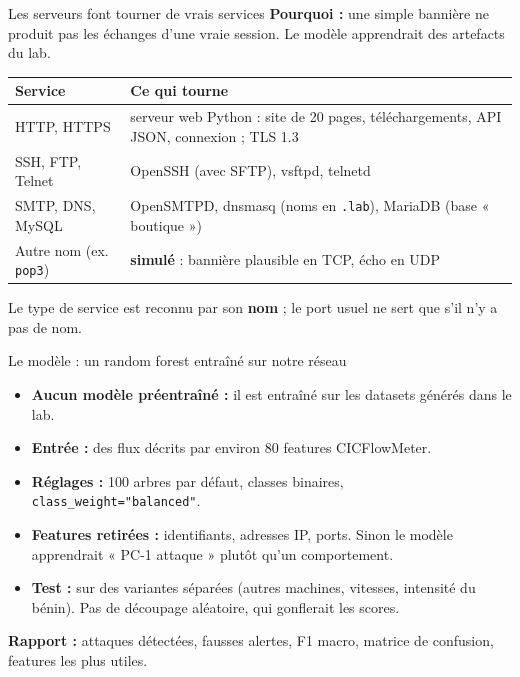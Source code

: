 \documentclass[aspectratio=169,11pt,xcolor=table]{beamer}
\newcommand{\espacement}{\setlength{\itemsep}{.7em}}
\begin{document}
\begin{frame}{Les serveurs font tourner de vrais services}
  \textbf{Pourquoi :} une simple bannière ne produit pas les échanges d'une vraie session. Le modèle apprendrait des artefacts du lab.
  \vspace{.6em}

  \small
  \renewcommand{\arraystretch}{1.2}
  \begin{tabularx}{\linewidth}{@{}p{.3\linewidth}X@{}}
    \toprule
    \textbf{Service} & \textbf{Ce qui tourne} \\
    \midrule
    HTTP, HTTPS & serveur web Python : site de 20 pages, téléchargements, API JSON, connexion ; TLS 1.3 \\
    SSH, FTP, Telnet & OpenSSH (avec SFTP), vsftpd, telnetd \\
    SMTP, DNS, MySQL & OpenSMTPD, dnsmasq (noms en \texttt{.lab}), MariaDB (base « boutique ») \\
    \midrule
    Autre nom (ex. \texttt{pop3}) & \textbf{simulé} : bannière plausible en TCP, écho en UDP \\
    \bottomrule
  \end{tabularx}
  \vfill
  \normalsize
  Le type de service est reconnu par son \textbf{nom} ; le port usuel ne sert que s'il n'y a pas de nom.
\end{frame}

\begin{frame}{Le modèle : un random forest entraîné sur notre réseau}
  \begin{itemize}\espacement
    \item \textbf{Aucun modèle préentraîné :} il est entraîné sur les datasets générés dans le lab.
    \item \textbf{Entrée :} des flux décrits par environ 80 features CICFlowMeter.
    \item \textbf{Réglages :} 100 arbres par défaut, classes binaires, \texttt{class\_weight="balanced"}.
    \item \textbf{Features retirées :} identifiants, adresses IP, ports. Sinon le modèle apprendrait « PC-1 attaque » plutôt qu'un comportement.
    \item \textbf{Test :} sur des variantes séparées (autres machines, vitesses, intensité du bénin). Pas de découpage aléatoire, qui gonflerait les scores.
  \end{itemize}
  \vfill
  \textbf{Rapport :} attaques détectées, fausses alertes, F1 macro, matrice de confusion, features les plus utiles.
\end{frame}
\end{document}
